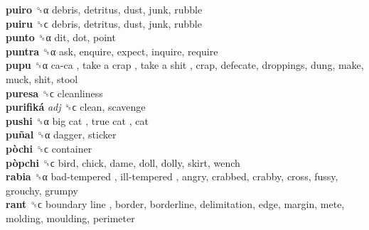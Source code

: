 \textbf{puiro} ␝α  debris, detritus, dust, junk, rubble  \\
\textbf{puiru} ␝ϲ  debris, detritus, dust, junk, rubble  \\
\textbf{punto} ␝α  dit, dot, point  \\
\textbf{puntra} ␝α  ask, enquire, expect, inquire, require  \\
\textbf{pupu} ␝α   ca-ca ,  take a crap ,  take a shit , crap, defecate, droppings, dung, make, muck, shit, stool  \\
\textbf{puresa} ␝ϲ  cleanliness  \\
\textbf{purifiká} \emph{adj}  ␝ϲ  clean, scavenge  \\
\textbf{pushi} ␝α   big cat ,  true cat , cat  \\
\textbf{puñal} ␝α  dagger, sticker  \\
\textbf{pòchi} ␝ϲ  container  \\
\textbf{pòpchi} ␝ϲ  bird, chick, dame, doll, dolly, skirt, wench  \\
\textbf{rabia} ␝α   bad-tempered ,  ill-tempered , angry, crabbed, crabby, cross, fussy, grouchy, grumpy  \\
\textbf{rant} ␝ϲ   boundary line , border, borderline, delimitation, edge, margin, mete, molding, moulding, perimeter  \\

